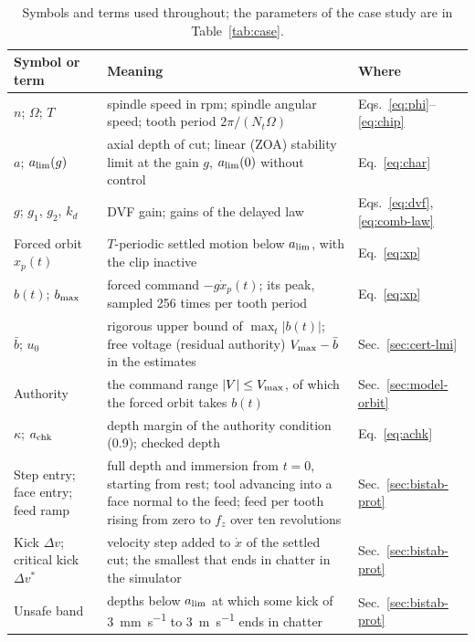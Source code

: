 \begin{table}[!tbp]
  \centering
  \caption{Symbols and terms used throughout; the parameters of the case study are in Table~\ref{tab:case}.}
  \label{tab:nomenclature}
  \footnotesize
  \begin{tabular}{@{}>{\raggedright\arraybackslash}p{}>{\raggedright\arraybackslash}p{}>{\raggedright\arraybackslash}p{}@{}}
    \toprule
    Symbol or term & Meaning & Where\\
    \midrule
    $n$; $\Omega$; $T$ & spindle speed in rpm; spindle angular speed; tooth period $2\pi/(N_t\Omega)$ & Eqs.~\eqref{eq:phi}--\eqref{eq:chip}\\
    $a$; $a_{\lim}(g)$ & axial depth of cut; linear (ZOA) stability limit at the gain $g$, $a_{\lim}(0)$ without control & Eq.~\eqref{eq:char}\\
    $g$; $g_1$, $g_2$, $k_d$ & DVF gain; gains of the delayed law & Eqs.~\eqref{eq:dvf}, \eqref{eq:comb-law}\\
    Forced orbit $x_p(t)$ & $T$-periodic settled motion below $a_{\lim}$, with the clip inactive & Eq.~\eqref{eq:xp}\\
    $b(t)$; $b_{\max}$ & forced command $-g\dot x_p(t)$; its peak, sampled 256 times per tooth period & Eq.~\eqref{eq:xp}\\
    $\bar b$; $u_0$ & rigorous upper bound of $\max_t\lvert b(t)\rvert$; free voltage (residual authority) $V_{\max}-\bar b$ in the estimates & Sec.~\ref{sec:cert-lmi}\\
    Authority & the command range $\lvert V\rvert\le V_{\max}$, of which the forced orbit takes $b(t)$ & Sec.~\ref{sec:model-orbit}\\
    $\kappa$; $a_{\mathrm{chk}}$ & depth margin of the authority condition (0.9); checked depth & Eq.~\eqref{eq:achk}\\
    Step entry; face entry; feed ramp & full depth and immersion from $t=0$, starting from rest; tool advancing into a face normal to the feed; feed per tooth rising from zero to $f_z$ over ten revolutions & Sec.~\ref{sec:bistab-prot}\\
    Kick $\Delta v$; critical kick $\Delta v^*$ & velocity step added to $\dot x$ of the settled cut; the smallest that ends in chatter in the simulator & Sec.~\ref{sec:bistab-prot}\\
    Unsafe band & depths below $a_{\lim}$ at which some kick of \SI{3}{\milli\metre\per\second} to \SI{3}{\metre\per\second} ends in chatter & Sec.~\ref{sec:bistab-prot}\\

\end{tabular}
\end{table}
